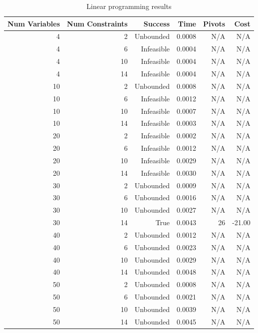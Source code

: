 \begin{table}[ht]
    \centering
    \begin{tabular}{rrrrrr}
        \toprule
        Num Variables & Num Constraints & Success & Time & Pivots & Cost \\
        \midrule
        4 & 2 & Unbounded & 0.0008 & N/A & N/A \\
		4 & 6 & Infeasible & 0.0004 & N/A & N/A \\
		4 & 10 & Infeasible & 0.0004 & N/A & N/A \\
		4 & 14 & Infeasible & 0.0004 & N/A & N/A \\
		10 & 2 & Unbounded & 0.0008 & N/A & N/A \\
		10 & 6 & Infeasible & 0.0012 & N/A & N/A \\
		10 & 10 & Infeasible & 0.0007 & N/A & N/A \\
		10 & 14 & Infeasible & 0.0003 & N/A & N/A \\
		20 & 2 & Infeasible & 0.0002 & N/A & N/A \\
		20 & 6 & Infeasible & 0.0012 & N/A & N/A \\
		20 & 10 & Infeasible & 0.0029 & N/A & N/A \\
		20 & 14 & Infeasible & 0.0030 & N/A & N/A \\
		30 & 2 & Unbounded & 0.0009 & N/A & N/A \\
		30 & 6 & Unbounded & 0.0016 & N/A & N/A \\
		30 & 10 & Unbounded & 0.0027 & N/A & N/A \\
		30 & 14 & True & 0.0043 & 26 & -21.00 \\
		40 & 2 & Unbounded & 0.0012 & N/A & N/A \\
		40 & 6 & Unbounded & 0.0023 & N/A & N/A \\
		40 & 10 & Unbounded & 0.0029 & N/A & N/A \\
		40 & 14 & Unbounded & 0.0048 & N/A & N/A \\
		50 & 2 & Unbounded & 0.0008 & N/A & N/A \\
		50 & 6 & Unbounded & 0.0021 & N/A & N/A \\
		50 & 10 & Unbounded & 0.0039 & N/A & N/A \\
		50 & 14 & Unbounded & 0.0045 & N/A & N/A \\
        \bottomrule
    \end{tabular}
    \caption{Linear programming results}
    \label{tab:lp-results}
\end{table}
